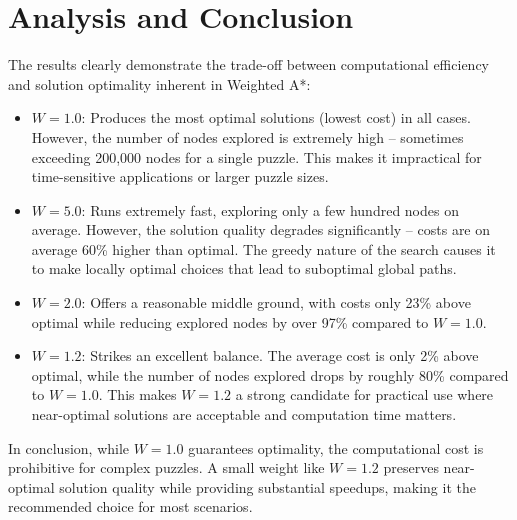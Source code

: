 \documentclass[12pt,a4paper]{article}
\begin{document}
\section{Analysis and Conclusion}

The results clearly demonstrate the trade-off between computational efficiency
and solution optimality inherent in Weighted A*:

\begin{itemize}
  \item \textbf{$W = 1.0$}: Produces the most optimal solutions (lowest cost)
  in all cases. However, the number of nodes explored is extremely high --
  sometimes exceeding 200,000 nodes for a single puzzle. This makes it
  impractical for time-sensitive applications or larger puzzle sizes.

  \item \textbf{$W = 5.0$}: Runs extremely fast, exploring only a few hundred
  nodes on average. However, the solution quality degrades significantly --
  costs are on average 60\% higher than optimal. The greedy nature of the
  search causes it to make locally optimal choices that lead to suboptimal
  global paths.

  \item \textbf{$W = 2.0$}: Offers a reasonable middle ground, with costs only
  23\% above optimal while reducing explored nodes by over 97\% compared to
  $W = 1.0$.

  \item \textbf{$W = 1.2$}: Strikes an excellent balance. The average cost is
  only 2\% above optimal, while the number of nodes explored drops by roughly
  80\% compared to $W = 1.0$. This makes $W = 1.2$ a strong candidate for
  practical use where near-optimal solutions are acceptable and computation
  time matters.
\end{itemize}

In conclusion, while $W = 1.0$ guarantees optimality, the computational cost
is prohibitive for complex puzzles. A small weight like $W = 1.2$ preserves
near-optimal solution quality while providing substantial speedups, making it
the recommended choice for most scenarios.
\end{document}
